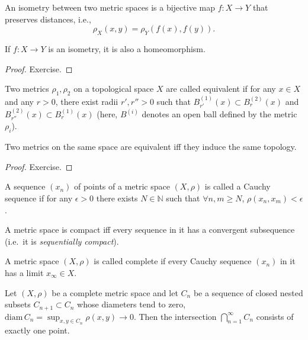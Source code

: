 \begin{defn}[Isometry]
An isometry between two metric spaces is a bijective map $f:X\rightarrow Y$ that preserves distances, i.e.,
\begin{equation}
    \rho_X(x,y) = \rho_Y(f(x), f(y)).
\end{equation}
\end{defn}

\begin{prop}
If $f:X\rightarrow Y$ is an isometry, it is also a homeomorphism.
\end{prop}
\begin{proof}
Exercise.
\end{proof}

\begin{defn}
Two metrics $\rho_1,\rho_2$ on a topological space $X$ are called equivalent if for any $x\in X$ and any $r>0$, there exist radii $r',r''>0$ such that $B^{(1)}_{r'}(x)\subset B^{(2)}_{r}(x)$ and $B^{(2)}_{r''}(x)\subset B^{(1)}_{r}(x)$ (here, $B^{(i)}$ denotes an open ball defined by the metric $\rho_i$).
\end{defn}

\begin{thm}
Two metrics on the same space are equivalent iff they induce the same topology.
\end{thm}
\begin{proof}
Exercise.
\end{proof}

\begin{defn}
A sequence $(x_n)$ of points of a metric space $(X,\rho)$ is called a Cauchy sequence if for any $\epsilon>0$ there exists $N\in\mathbb{N}$ such that $\forall n,m\geq N$, $\rho(x_n,x_m)<\epsilon$.
\end{defn}

\begin{prop}
    A metric space is compact iff every sequence in it has a convergent subsequence (i.e.~it is \emph{sequentially compact}).
\end{prop}

\begin{defn}[Completeness]
A metric space $(X,\rho)$ is called complete if every Cauchy sequence $(x_n)$ in it has a limit $x_\infty\in X$.
\end{defn}


\begin{thm}
Let $(X,\rho)$ be a complete metric space and let $C_n$ be a sequence of closed nested subsets $C_{n+1}\subset C_n$ whose diameters tend to zero, $\mathrm{diam}\,C_n=\sup_{x,y\in C_n} \rho(x,y) \to 0$. Then the intersection $\bigcap_{n=1}^\infty C_n$ consists of exactly one point.
\end{thm}


